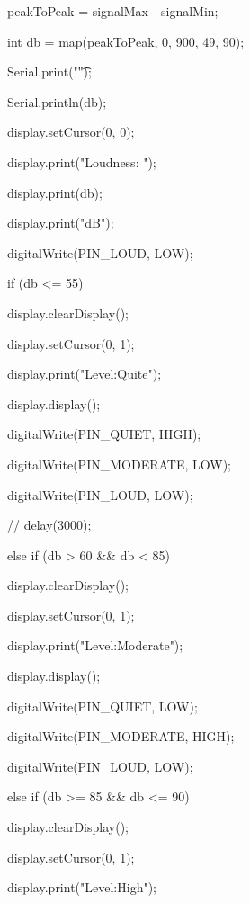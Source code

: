 \begin{Arduino}
{{{{				}
				
			}
			
		}
		
		peakToPeak = signalMax - signalMin;                    
		
		int db = map(peakToPeak, 0, 900, 49, 90);         
		
		Serial.print("\t");
		
		Serial.println(db);
		
		display.setCursor(0, 0);
		
		display.print("Loudness: ");
		
		display.print(db);
		
		display.print("dB");
		
		digitalWrite(PIN_LOUD, LOW);
		
		if (db <= 55)
		
		{
			
			
			
			display.clearDisplay();
			
			display.setCursor(0, 1);
			
			display.print("Level:Quite");
			
			display.display();
			
			digitalWrite(PIN_QUIET, HIGH);
			
			digitalWrite(PIN_MODERATE, LOW);
			
			digitalWrite(PIN_LOUD, LOW);
			
			//  delay(3000);
			
		}
		
		else if (db > 60 && db < 85)
		
		{
			
			display.clearDisplay();
			
			display.setCursor(0, 1);
			
			display.print("Level:Moderate");
			
			display.display();
			
			digitalWrite(PIN_QUIET, LOW);
			
			digitalWrite(PIN_MODERATE, HIGH);
			
			digitalWrite(PIN_LOUD, LOW);
			
		}
		
		else if (db >= 85 && db <= 90)
		
		{
			
			display.clearDisplay();
			
			display.setCursor(0, 1);
			
			display.print("Level:High");
			
}}
\end{Arduino}
